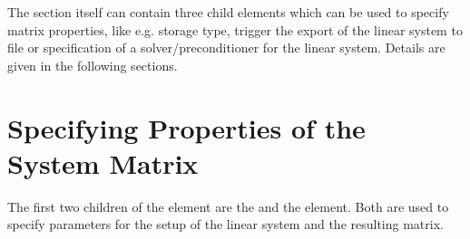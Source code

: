 The  section itself can contain three child elements which can be
used to specify matrix properties, like e.g. storage type, trigger the export
of the linear system to file or specification of a solver/preconditioner for
the linear system. Details are given in the following sections.
%
%
\section{Specifying Properties of the System Matrix}
%
%
The first two children of the  element are the  and
the  element. Both are used to specify parameters for the setup
of the linear system and the resulting matrix.

